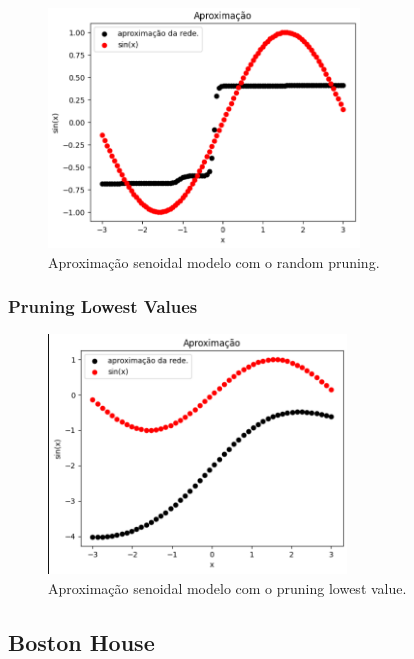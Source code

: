 \documentclass{article}
\begin{document}
\begin{figure}[h]

    \centering
    \includegraphics[height=2.5in]{sin_random_pru.png}
    \caption{Aproximação senoidal modelo com o random pruning.}
    \label{fig:example}
    
\end{figure}

\newpage

\subsubsection*{Pruning Lowest Values}

\vspace{25pt}

\begin{figure}[h]

    \centering
    \includegraphics[height=2.5in]{sin_plv.png}
    \caption{Aproximação senoidal modelo com o pruning lowest value.}
    \label{fig:example}
    
\end{figure}










\subsection{Boston House}
\end{document}
